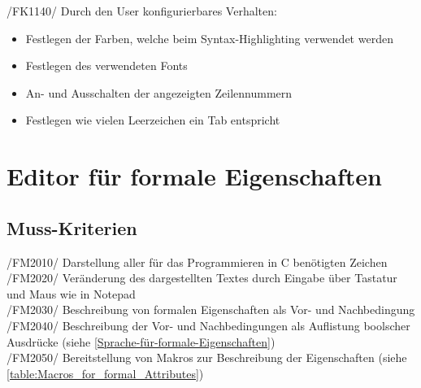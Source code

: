 \documentclass[a4paper]{scrreprt}
\begin{document}
/FK1140/ Durch den User konfigurierbares Verhalten:
\begin{itemize}
\item Festlegen der Farben, welche beim Syntax-Highlighting verwendet werden
\item Festlegen des verwendeten Fonts
\item An- und Ausschalten der angezeigten Zeilennummern
\item Festlegen wie vielen Leerzeichen ein Tab entspricht
\end{itemize}
 
\section{Editor für formale Eigenschaften}
\subsection{Muss-Kriterien}
/FM2010/ Darstellung aller für das Programmieren in C benötigten Zeichen \\
/FM2020/ Veränderung des dargestellten Textes durch Eingabe über Tastatur und Maus wie in Notepad \\
/FM2030/ Beschreibung von formalen Eigenschaften als Vor- und Nachbedingung  \\
/FM2040/ Beschreibung der Vor- und Nachbedingungen als Auflistung boolscher Ausdrücke (siehe \ref{Sprache-für-formale-Eigenschaften})\\
/FM2050/ Bereitstellung von Makros zur Beschreibung der Eigenschaften (siehe \ref{table:Macros_for_formal_Attributes}) \\
\end{document}
